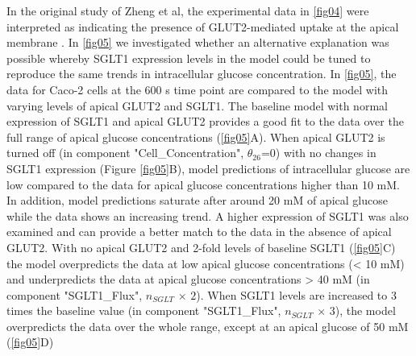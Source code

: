 \documentclass[fleqn,10pt]{physiome}
\begin{document}
In the original study of Zheng et al, the experimental data in \autoref{fig04}
were interpreted as indicating the presence of GLUT2-mediated uptake at the
apical membrane \citep{zheng2012mechanisms}. In \autoref{fig05} we investigated whether an alternative explanation
was possible whereby SGLT1 expression levels in the model could be
tuned to reproduce the same trends in intracellular glucose concentration. In
\autoref{fig05}, the data for Caco-2 cells at the 600 s time point are compared
to the model with varying levels of apical GLUT2 and SGLT1. The baseline
model with normal expression of SGLT1 and apical GLUT2 provides a good fit
to the data over the full range of apical glucose concentrations (\autoref{fig05}A). 
When apical GLUT2 is turned off (in component "Cell\_Concentration", {$\theta_{26}$}=0) with no changes in SGLT1 expression (Figure
\ref{fig05}B), model predictions of intracellular glucose are low compared to the
data for apical glucose concentrations higher than 10 mM. In addition, model
predictions saturate after around 20 mM of apical glucose while the data shows
an increasing trend. A higher expression of SGLT1 was also examined and can
provide a better match to the data in the absence of apical GLUT2. With
no apical GLUT2 and 2-fold levels of baseline SGLT1 (\autoref{fig05}C) the model
overpredicts the data at low apical glucose concentrations (< 10 mM) and underpredicts
the data at apical glucose concentrations > 40 mM (in component "SGLT1\_Flux", $n_{SGLT}$ $\times$ $2$). When SGLT1 levels are increased to 3 times the baseline value (in component "SGLT1\_Flux", $n_{SGLT}$ $\times$ $3$), the model overpredicts the data over the whole range, except at an apical glucose of 50 mM (\autoref{fig05}D)
\end{document}

